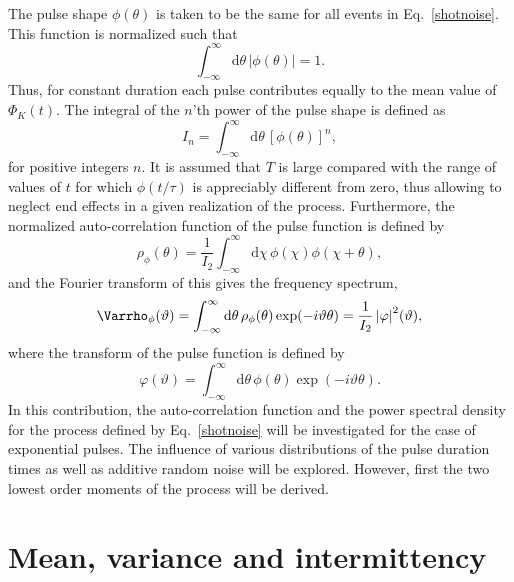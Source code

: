 \documentclass[aps,prb,12pt,a4paper,preprint,amsmath,amssymb,groupedaddress]{revtex4-1}
\newcommand{\abs}[1]{{\left|#1\right|}}\newcommand{\order}[1]{{\mathcal{O}\left(#1\right)}}
\newcommand{\rmd}{\text{d}}
\newcommand{\Eqref}[1]{Eq.~\eqref{#1}}
\begin{document}
The pulse shape $\phi(\theta)$ is taken to be the same for all events in \Eqref{shotnoise}. This function is normalized such that
\begin{equation}\label{duration}
\int_{-\infty}^{\infty} \rmd\theta\,\abs{\phi(\theta)} = 1 .
\end{equation}
Thus, for constant duration each pulse contributes equally to the mean value of $\Phi_K(t)$. The integral of the $n$'th power of the pulse shape is defined as
\begin{equation}\label{pulseint}
I_n = \int_{-\infty}^{\infty} \rmd\theta\,\left[ \phi(\theta) \right]^n ,
\end{equation}
for positive integers $n$. It is assumed that $T$ is large compared with the range of values of $t$ for which $\phi(t/\tau)$ is appreciably different from zero, thus allowing to neglect end effects in a given realization of the process. Furthermore, the normalized auto-correlation function of the pulse function is defined by\cite{garcia-phpl}
\begin{equation}\label{rhophi}
\rho_\phi(\theta) = \frac{1}{I_2}\int_{-\infty}^{\infty} \rmd\chi\,\phi(\chi)\phi(\chi+\theta) ,
\end{equation}
and the Fourier transform of this gives the frequency spectrum,
\begin{equation}\label{varrhophi}
\Varrho_\phi(\vartheta) = \int_{-\infty}^\infty \rmd\theta\,\rho_\phi(\theta)\exp(-i\vartheta\theta) = \frac{1}{I_2}\,\abs{\varphi}^2(\vartheta) ,
\end{equation}
where the transform of the pulse function is defined by
\begin{equation}\label{varphi}
\varphi(\vartheta) = \int_{-\infty}^\infty \rmd\theta\,\phi(\theta)\exp(-i\vartheta\theta) .
\end{equation}
In this contribution, the auto-correlation function and the power spectral density for the process defined by \Eqref{shotnoise} will be investigated for the case of exponential pulses. The influence of various distributions of the pulse duration times as well as additive random noise will be explored. However, first the two lowest order moments of the process will be derived.



\section{Mean, variance and intermittency}\label{sec:moments}
\end{document}
